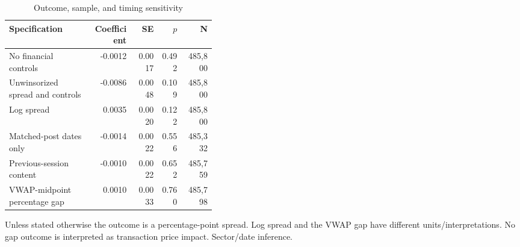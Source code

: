 \begin{table}[htbp]
\centering
\caption{Outcome, sample, and timing sensitivity}
\label{tab:sensitivity}
\begin{minipage}{\linewidth}
\footnotesize
\setlength{\tabcolsep}{4pt}
\begingroup\centering
\begin{tabular}{p{0.40\linewidth}rrrr}
\toprule
Specification & Coefficient & SE & $p$ & N \\
\midrule
No financial controls & -0.0012 & 0.0017 & 0.492 & 485,800 \\
Unwinsorized spread and controls & -0.0086 & 0.0048 & 0.109 & 485,800 \\
Log spread & 0.0035 & 0.0020 & 0.122 & 485,800 \\
Matched-post dates only & -0.0014 & 0.0022 & 0.556 & 485,332 \\
Previous-session content & -0.0010 & 0.0022 & 0.652 & 485,759 \\
VWAP-midpoint percentage gap & 0.0010 & 0.0033 & 0.760 & 485,798 \\
\bottomrule
\end{tabular}\par\endgroup
\par\vspace{0.5em}\footnotesize Unless stated otherwise the outcome is a percentage-point spread. Log spread and the VWAP gap have different units/interpretations. No gap outcome is interpreted as transaction price impact. Sector/date inference.
\end{minipage}
\end{table}
